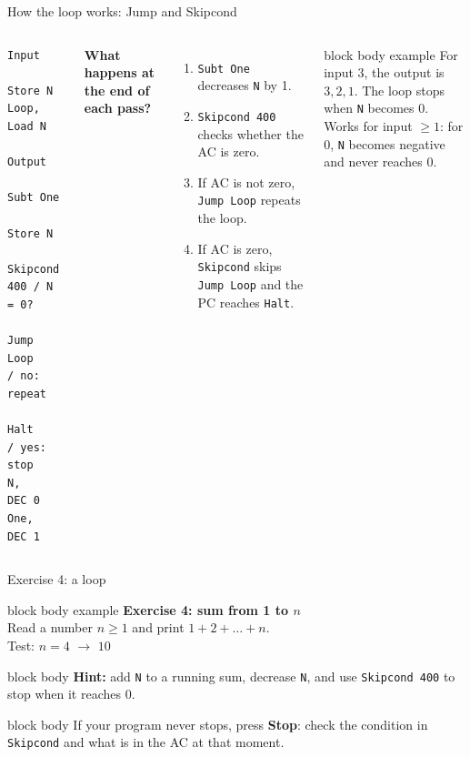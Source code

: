 \documentclass[aspectratio=169,10pt]{beamer}
\begin{document}
\begin{frame}[fragile]{How the loop works: Jump and Skipcond}
  \begin{columns}[T,onlytextwidth]
\begin{lstlisting}[style=marie]
      Input
      Store N
Loop, Load N
      Output
      Subt One
      Store N
      Skipcond 400 / N = 0?
      Jump Loop    / no: repeat
      Halt         / yes: stop
N,    DEC 0
One,  DEC 1
\end{lstlisting}
      \footnotesize
      \textbf{What happens at the end of each pass?}
      \begin{enumerate}\setlength{\itemsep}{3pt}
        \item \texttt{Subt One} decreases \texttt{N} by 1.
        \item \texttt{Skipcond 400} checks whether the AC is zero.
        \item If AC is not zero, \texttt{Jump Loop} repeats the loop.
        \item If AC is zero, \texttt{Skipcond} skips \texttt{Jump Loop} and the PC reaches \texttt{Halt}.
      \end{enumerate}
      \vspace{0.05cm}
      \begin{beamercolorbox}[rounded=true,sep=0.1cm,wd=\linewidth]{block body example}
        \scriptsize
        For input $3$, the output is $3,2,1$. The loop stops when \texttt{N} becomes $0$.\\
        Works for input $\ge 1$: for $0$, \texttt{N} becomes negative and never reaches $0$.
      \end{beamercolorbox}
  \end{columns}
\end{frame}

\begin{frame}{Exercise 4: a loop}
  \begin{beamercolorbox}[rounded=true,sep=0.14cm,wd=0.68\textwidth]{block body example}
    \small\textbf{Exercise 4: sum from 1 to $n$}\\[0.08cm]
    \footnotesize
    Read a number $n \ge 1$ and print $1+2+\dots+n$.\\[0.08cm]
    \scriptsize Test: $n=4$ $\to$ $10$
  \end{beamercolorbox}
  \vspace{0.1cm}
  \begin{beamercolorbox}[rounded=true,sep=0.1cm,wd=0.68\textwidth]{block body}
    \scriptsize
    \textbf{Hint:} add \texttt{N} to a running sum, decrease \texttt{N}, and use
    \texttt{Skipcond 400} to stop when it reaches 0.
  \end{beamercolorbox}
  \vfill
  \begin{beamercolorbox}[rounded=true,sep=0.1cm,wd=\textwidth]{block body}
    \centering\scriptsize
    If your program never stops, press \textbf{Stop}: check the condition in \texttt{Skipcond} and what is in the AC at that moment.
  \end{beamercolorbox}
\end{frame}
\end{document}
